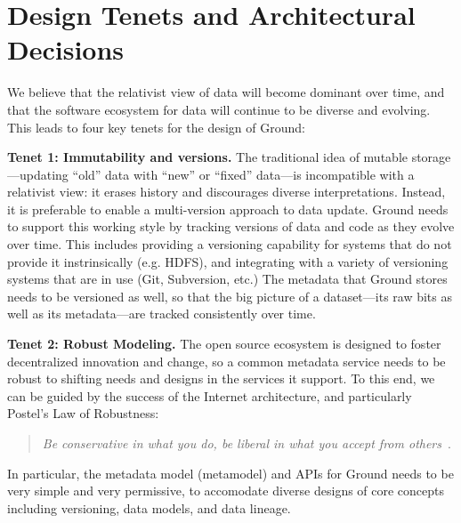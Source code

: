 \documentclass[10pt,letterpaper]{article}
\begin{document}
\section{Design Tenets and Architectural Decisions}
\label{sec:designreqs}
We believe that the relativist view of data will become dominant over time, and that the software ecosystem for data will continue to be diverse and evolving.  This leads to four key tenets for the design of Ground:

\vspace{0.5em}\noindent
\textbf{Tenet 1: Immutability and versions.}  The traditional idea of mutable storage---updating ``old'' data with ``new'' or ``fixed'' data---is incompatible with a relativist view: it erases history and discourages diverse interpretations. Instead, it is preferable to enable a multi-version approach to data update.
Ground needs to support this working style by tracking versions of data and code as they evolve over time.  This includes providing a versioning capability for systems that do not provide it instrinsically (e.g. HDFS), and integrating with a variety of versioning systems that are in use (Git, Subversion, etc.)  The metadata that Ground stores needs to be versioned as well, so that the big picture of a dataset---its raw bits as well as its metadata---are tracked consistently over time.


\vspace{0.5em}\noindent
\textbf{Tenet 2: Robust Modeling.}  The open source ecosystem is designed to foster decentralized innovation and change, so a common metadata service needs to be robust to shifting needs and designs in the services it support. To this end, we can be guided by the success of the Internet architecture, and particularly Postel's Law of Robustness:
\begin{quote}
\emph{Be conservative in what you do, be liberal in what you accept from others}~\cite{postel}.
\end{quote}
In particular, the metadata model (metamodel) and APIs for Ground needs to be very simple and very permissive, to accomodate diverse designs of core concepts including versioning, data models, and data lineage.
\end{document}
